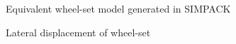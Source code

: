 \documentclass[]{interact}
\theoremstyle{plain}%
\theoremstyle{definition}
\theoremstyle{remark}
\begin{document}
\begin{figure}
\centering
{}
\caption{Equivalent wheel-set model generated in SIMPACK} \label{fig:Wheelset}
\end{figure}
\begin{figure}
\centering
{}
\caption{Lateral displacement of wheel-set } \label{fig:lateraldisp}
\end{figure}
\end{document}
